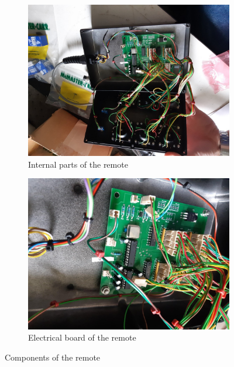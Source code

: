 \documentclass[12pt, a4paper]{article}
\begin{document}
\begin{figure}[h]
	\begin{subfigure}[t]{0.4\textwidth}
		\includegraphics[width=\textwidth]{remote_internal} 
		\caption{Internal parts of the remote}
		\label{fig:remote_in}
	\end{subfigure}
	\hfill%
	\begin{subfigure}[t]{0.4\textwidth}
		\includegraphics[width=\textwidth]{remote_board}
		\caption{Electrical board of the remote}
		\label{fig:remote_board}
	\end{subfigure}
 	\caption{Components of the remote}
	\label{fig:remote_comps}
\end{figure}
\end{document}
